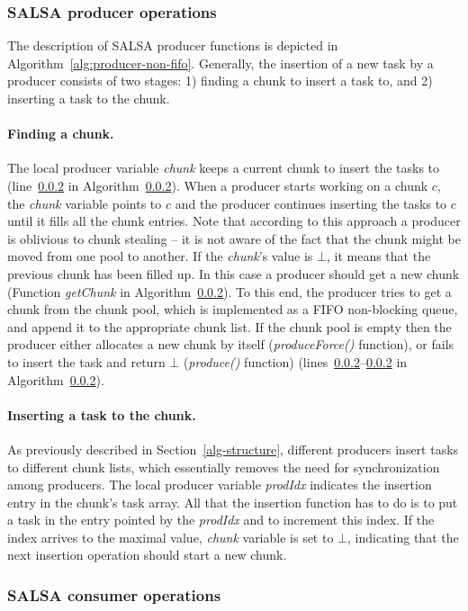 \subsubsection {SALSA producer operations}

The description of SALSA producer functions is depicted in Algorithm~\ref{alg:producer-non-fifo}. 
Generally, the insertion of a new task by a producer consists of two stages: 
1) finding a chunk to insert a task to, and 2) inserting a task to the chunk. 

\paragraph {Finding a chunk.}
The local producer variable \emph{chunk} keeps a current chunk to insert the tasks to (line~\ref{} in Algorithm~\ref{}). 
When a producer starts working on a chunk $c$, the \emph{chunk} variable points to $c$ and the producer continues inserting the tasks to $c$ until it fills all the chunk entries. 
Note that according to this approach a producer is oblivious to chunk stealing -- it is not aware of the fact that the chunk might be moved from one pool to another.  
If the \emph{chunk}'s value is $\bot$, it means that the previous chunk has been filled up. In this case a producer should get a new chunk (Function \emph{getChunk} in Algorithm~\ref{}). 
To this end, the producer tries to get a chunk from the chunk pool, which is implemented as a FIFO non-blocking queue, and append it to the appropriate chunk list. If the chunk pool is empty then the producer either allocates a new chunk by itself (\emph{produceForce()} function), or fails to insert the task and return $\bot$ (\emph{produce()} function) (lines~\ref{}--\ref{} in Algorithm~\ref{}). 

\paragraph {Inserting a task to the chunk.}
As previously described in Section~\ref{alg-structure}, different producers insert tasks to different chunk lists, which essentially removes the need for synchronization among producers. 
The local producer variable \emph{prodIdx} indicates the insertion entry in the chunk's task array.
All that the insertion function has to do is to put a task in the entry pointed by the \emph{prodIdx} and to increment this index.
If the index arrives to the maximal value, \emph{chunk} variable is set to $\bot$, indicating that the next insertion operation should start a new chunk. 

\subsubsection {SALSA consumer operations}

